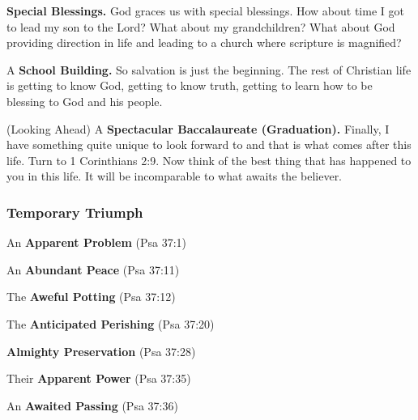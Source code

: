 \begin{compactenum}[I.][19]
    \item \textbf{Special Blessings.} God graces us with special blessings. How about time I got to lead my son to the Lord? What about my grandchildren? What about God providing direction in life and leading to a church where scripture is magnified?  %
    \item A \textbf{School Building.} So salvation is just the beginning.  The rest of Christian life is getting to know God, getting to know truth, getting to learn how to be blessing to God and his people. %
    \item (Looking Ahead) A \textbf{Spectacular Baccalaureate (Graduation).} Finally, I have something quite unique to look forward to and that is what comes after this life. Turn to 1 Corinthians 2:9. Now think of the best thing that has happened to you in this life.  It will be incomparable to what awaits the believer. %
\end{compactenum}


\subsubsection{Temporary Triumph}


\begin{compactenum}[I.][19]
   \item An \textbf{Apparent Problem} (Psa 37:1) 
   \item An \textbf{Abundant Peace} (Psa 37:11) 
   \item The \textbf{Aweful Potting} (Psa 37:12) 
   \item The \textbf{Anticipated Perishing} (Psa 37:20) 
    \item \textbf{Almighty Preservation} (Psa 37:28)
 \item Their \textbf{Apparent Power} (Psa 37:35)
 \item An \textbf{Awaited Passing} (Psa 37:36)
\end{compactenum}





